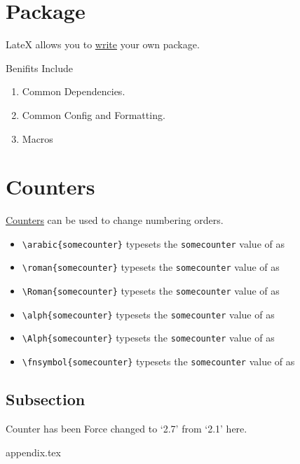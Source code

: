 \documentclass{report}[a4paper,12pt] %
\begin{document}
\section{Package}
LateX allows you to \href{https://www.overleaf.com/learn/latex/Writing_your_own_package}{write} your own package.

Benifits Include
\begin{enumerate}
  \item Common Dependencies.
  \item Common Config and Formatting.
  \item Macros
\end{enumerate}

\section{Counters}
\href{https://www.overleaf.com/learn/latex/Counters}{Counters} can be used to change numbering orders.

\setcounter{somecounter}{9}
\begin{itemize}
    \item \verb|\arabic{somecounter}| typesets the \texttt{somecounter} value of  \thesomecounter{} as  
    \item \verb|\roman{somecounter}| typesets the \texttt{somecounter} value of  \thesomecounter{} as  
    \item \verb|\Roman{somecounter}| typesets the \texttt{somecounter} value of  \thesomecounter{} as  
    \item \verb|\alph{somecounter}| typesets the \texttt{somecounter} value of  \thesomecounter{} as  
   \item \verb|\Alph{somecounter}| typesets the \texttt{somecounter} value of  \thesomecounter{} as  
    \item \verb|\fnsymbol{somecounter}| typesets the \texttt{somecounter} value of  \thesomecounter{} as  
\end{itemize}

\setcounter{subsection}{6}
\subsection{Subsection}
Counter has been Force changed to `2.7' from `2.1' here.

{appendix.tex}
\end{document}
